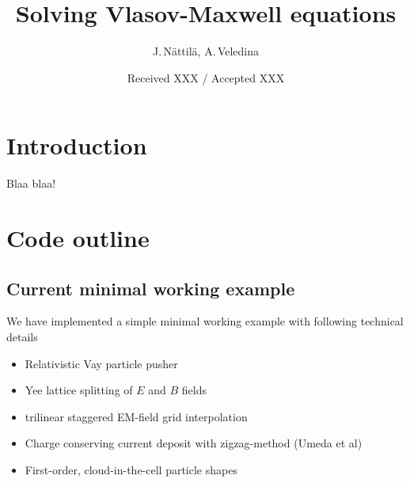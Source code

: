 \documentclass{aa}
\begin{document}
\title{Solving Vlasov-Maxwell equations}

\author{J.\,N\"attil\"a, A.\,Veledina}


\date{Received XXX / Accepted XXX}




\maketitle

\section{Introduction}\label{sec:intro}
Blaa blaa!

\section{Code outline}

\subsection{Current minimal working example}
We have implemented a simple minimal working example with following technical details 
\begin{itemize}
    \item Relativistic Vay particle pusher
    \item Yee lattice splitting of $E$ and $B$ fields
    \item trilinear staggered EM-field grid interpolation
    \item Charge conserving current deposit with zigzag-method (Umeda et al)
    \item First-order, cloud-in-the-cell particle shapes
\end{itemize}
\end{document}
